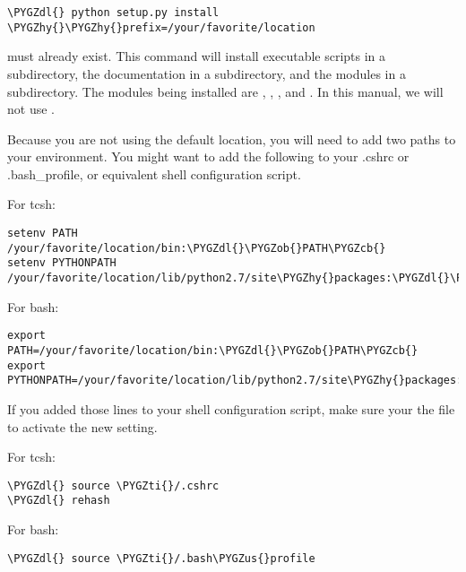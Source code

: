\documentclass[letterpaper,10pt,english]{sphinxmanual}
\def\PYGZus{\char`\_}
\def\PYGZob{\char`\{}
\def\PYGZcb{\char`\}}
\def\PYGZdl{\char`\$}
\def\PYGZhy{\char`\-}
\def\PYGZti{\char`\~}
\begin{document}
\begin{Verbatim}[commandchars=\\\{\}]
\PYGZdl{} python setup.py install \PYGZhy{}\PYGZhy{}prefix=/your/favorite/location
\end{Verbatim}

 must already exist.  This command will install executable
scripts in a  subdirectory, the documentation in a  subdirectory,
and the modules in a  subdirectory.  The modules being
installed are , , , and .
In this manual, we will not use .

Because you are not using the default location, you will need to add two paths to
your environment.  You might want to add the following to your .cshrc or .bash\_profile,
or equivalent shell configuration script.

For tcsh:

\begin{Verbatim}[commandchars=\\\{\}]
setenv PATH /your/favorite/location/bin:\PYGZdl{}\PYGZob{}PATH\PYGZcb{}
setenv PYTHONPATH /your/favorite/location/lib/python2.7/site\PYGZhy{}packages:\PYGZdl{}\PYGZob{}PYTHONPATH\PYGZcb{}
\end{Verbatim}

For bash:

\begin{Verbatim}[commandchars=\\\{\}]
export PATH=/your/favorite/location/bin:\PYGZdl{}\PYGZob{}PATH\PYGZcb{}
export PYTHONPATH=/your/favorite/location/lib/python2.7/site\PYGZhy{}packages:\PYGZdl{}\PYGZob{}PYTHONPATH\PYGZcb{}
\end{Verbatim}

If you added those lines to your shell configuration script, make sure your 
the file to activate the new setting.

For tcsh:

\begin{Verbatim}[commandchars=\\\{\}]
\PYGZdl{} source \PYGZti{}/.cshrc
\PYGZdl{} rehash
\end{Verbatim}

For bash:

\begin{Verbatim}[commandchars=\\\{\}]
\PYGZdl{} source \PYGZti{}/.bash\PYGZus{}profile
\end{Verbatim}
\end{document}

